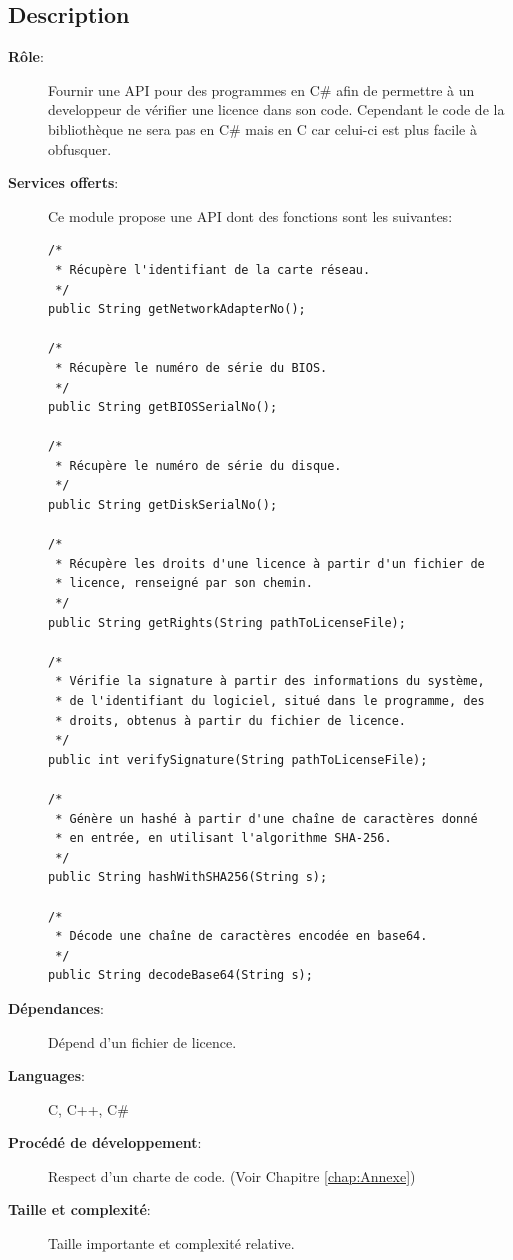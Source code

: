 \subsection{Description}
\begin{description}
	\item[\textbf{Rôle}:]
		Fournir une API pour des programmes en C\# afin de 
		permettre à un developpeur de vérifier une licence dans son code.
        Cependant le code de la bibliothèque ne sera pas en C\# mais en 
        C car celui-ci est plus facile à obfusquer. 

	\newpage

	\item[\textbf{Services offerts}:]
		Ce module propose une API dont des fonctions sont les suivantes:
		\begin{verbatim}
/*
 * Récupère l'identifiant de la carte réseau.
 */
public String getNetworkAdapterNo();

/*
 * Récupère le numéro de série du BIOS.
 */
public String getBIOSSerialNo();

/*
 * Récupère le numéro de série du disque.
 */
public String getDiskSerialNo();

/*
 * Récupère les droits d'une licence à partir d'un fichier de
 * licence, renseigné par son chemin.
 */
public String getRights(String pathToLicenseFile);

/*
 * Vérifie la signature à partir des informations du système,
 * de l'identifiant du logiciel, situé dans le programme, des
 * droits, obtenus à partir du fichier de licence.
 */
public int verifySignature(String pathToLicenseFile);

/*
 * Génère un hashé à partir d'une chaîne de caractères donné
 * en entrée, en utilisant l'algorithme SHA-256.
 */
public String hashWithSHA256(String s);

/*
 * Décode une chaîne de caractères encodée en base64.
 */
public String decodeBase64(String s);
			\end{verbatim}

	\item[\textbf{Dépendances}:]
		Dépend d'un fichier de licence.	
	\item[\textbf{Languages}:]
		C, C++, C\#
	\item[\textbf{Procédé de développement}:]
		Respect d'un charte de code. (Voir Chapitre \ref{chap:Annexe})
	\item[\textbf{Taille et complexité}:]
		Taille importante et complexité relative.
\end{description}

